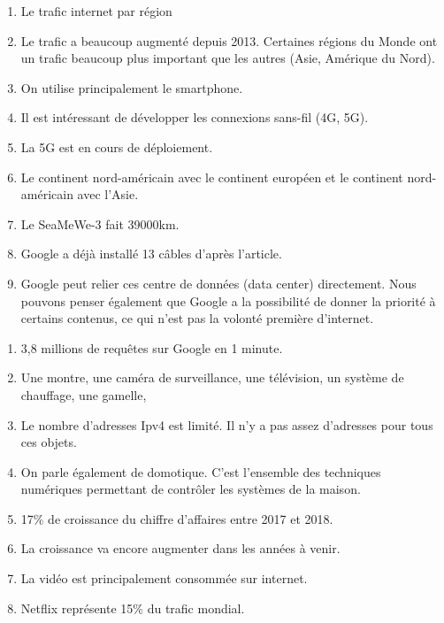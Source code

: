 \documentclass[a4paper,11pt]{article}
\begin{document}
\begin{Form}
\begin{exo}[Activité]
\begin{enumerate}
\item Le trafic internet par région
\item Le trafic a beaucoup augmenté depuis 2013. Certaines régions du Monde ont un trafic beaucoup plus important que les autres (Asie, Amérique du Nord).
\item On utilise principalement le smartphone.
\item Il est intéressant de développer les connexions sans-fil (4G, 5G).
\item La 5G est en cours de déploiement.
\item Le continent nord-américain avec le continent européen et le continent nord-américain avec l'Asie.
\item Le  SeaMeWe-3 fait 39000km.
\item Google a déjà installé 13 câbles d'après l'article.
\item Google peut relier ces centre de données (data center) directement. Nous pouvons penser également que Google a la possibilité de donner la priorité à certains contenus, ce qui n'est pas la volonté première d'internet.
\end{enumerate}
\end{exo}
\begin{exo}[Activité]
\begin{enumerate}
\item 3,8 millions de requêtes sur Google en 1 minute.
\item Une montre, une caméra de surveillance, une télévision, un système de chauffage, une gamelle, 
\item Le nombre d'adresses Ipv4 est limité. Il n'y a pas assez d'adresses pour tous ces objets.
\item On parle également de domotique. C'est l'ensemble des techniques numériques permettant de contrôler les systèmes de la maison.
\item 17\% de croissance du chiffre d'affaires entre 2017 et 2018.
\item La croissance va encore augmenter dans les années à venir.
\item La vidéo est principalement consommée sur internet.
\item Netflix représente 15\% du trafic mondial.
\end{enumerate}
\end{exo}
\end{Form}
\end{document}
